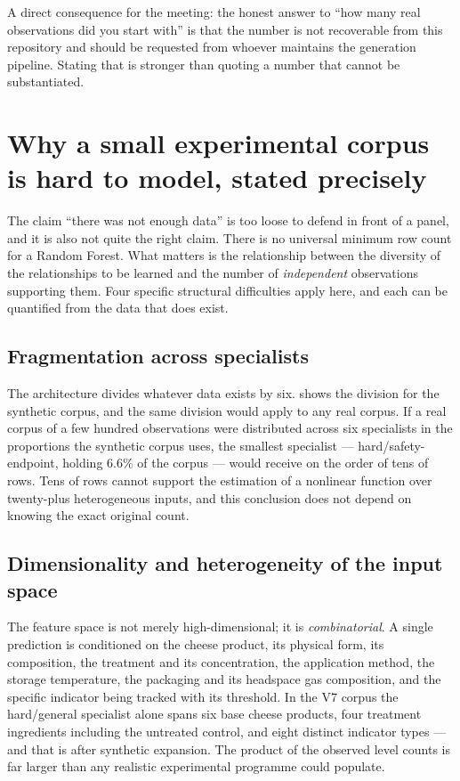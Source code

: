 
\noindent A direct consequence for the meeting: the honest answer to
``how many real observations did you start with'' is that the number is
not recoverable from this repository and should be requested from whoever
maintains the generation pipeline. Stating that is stronger than quoting a
number that cannot be substantiated.

\section{Why a small experimental corpus is hard to model, stated precisely}

The claim ``there was not enough data'' is too loose to defend in front of
a panel, and it is also not quite the right claim. There is no universal
minimum row count for a Random Forest. What matters is the relationship
between the diversity of the relationships to be learned and the number of
\emph{independent} observations supporting them. Four specific structural
difficulties apply here, and each can be quantified from the data that
does exist.

\subsection{Fragmentation across specialists}

The architecture divides whatever data exists by six. 
shows the division for the synthetic corpus, and the same division would
apply to any real corpus. If a real corpus of a few hundred observations
were distributed across six specialists in the proportions the synthetic
corpus uses, the smallest specialist --- hard/safety-endpoint, holding
$6.6\%$ of the corpus --- would receive on the order of tens of rows.
Tens of rows cannot support the estimation of a nonlinear function over
twenty-plus heterogeneous inputs, and this conclusion does not depend on
knowing the exact original count.

\subsection{Dimensionality and heterogeneity of the input space}

The feature space is not merely high-dimensional; it is
\emph{combinatorial}. A single prediction is conditioned on the cheese
product, its physical form, its composition, the treatment and its
concentration, the application method, the storage temperature, the
packaging and its headspace gas composition, and the specific indicator
being tracked with its threshold. In the V7 corpus the hard/general
specialist alone spans six base cheese products, four treatment
ingredients including the untreated control, and eight distinct indicator
types --- and that is after synthetic expansion. The product of the
observed level counts is far larger than any realistic experimental
programme could populate.

